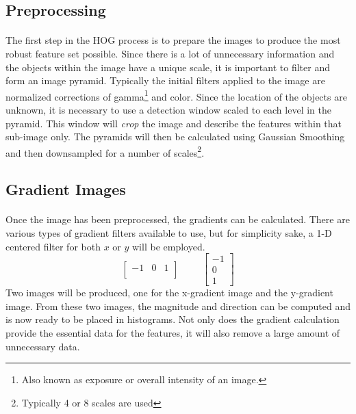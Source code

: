 \documentclass[11pt]{article}
\newcommand\simpleparagraph[1]{%
	\stepcounter{paragraph}\paragraph*{\theparagraph\quad{}#1}}
\renewcommand\theparagraph{}
\begin{document}
\subsection{Preprocessing}
\simpleparagraph{}
The first step in the HOG process is to prepare the images to produce the most robust feature set possible. Since there is a lot of unnecessary information and the objects within the image have a unique scale, it is important to filter and form an image pyramid. Typically the initial filters applied to the image are normalized corrections of gamma\footnote{Also known as exposure or overall intensity of an image.} and color. Since the location of the objects are unknown, it is necessary to use a detection window scaled to each level in the pyramid. This window will \textit{crop} the image and describe the features within that sub-image only. The pyramids will then be calculated using Gaussian Smoothing and then downsampled for a number of scales\footnote{Typically 4 or 8 scales are used}.

\subsection{Gradient Images}
\simpleparagraph{}
Once the image has been preprocessed, the gradients can be calculated. There are various types of gradient filters available to use, but for simplicity sake, a 1-D centered filter for both $x$ or $y$ will be employed.
{ \small
	\begin{equation}\label{equ:1DMask}
	\begin{bmatrix}
	-1 & 0 & 1\\
	\end{bmatrix}
	\hspace{1cm}	
	\begin{bmatrix}
	-1\\
	0\\
	1
	\end{bmatrix}
	\end{equation}
}
Two images will be produced, one for the x-gradient image and the y-gradient image. From these two images, the magnitude and direction can be computed and is now ready to be placed in histograms. Not only does the gradient calculation provide the essential data for the features, it will also remove a large amount of unnecessary data.
\end{document}
